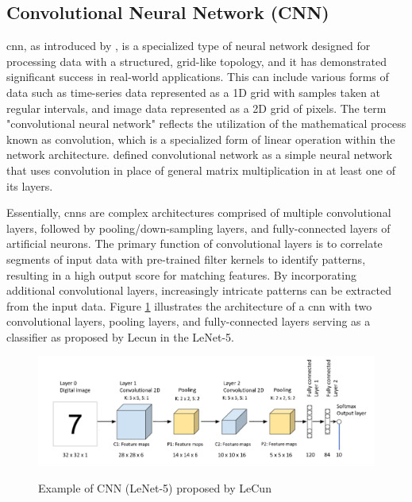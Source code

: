 \subsection{Convolutional Neural Network (CNN)}
\label{subsec:convolutional_neural_network_CNN}

\gls{cnn}, as introduced by \textcite{Lecun1998}, is a specialized type of neural network designed for processing data with a structured, grid-like topology, and it has demonstrated significant success in real-world applications. This can include various forms of data such as time-series data represented as a 1D grid with samples taken at regular intervals, and image data represented as a 2D grid of pixels. The term "convolutional neural network" reflects the utilization of the mathematical process known as convolution, which is a specialized form of linear operation within the network architecture. \textcite{Goodfellow2016} defined convolutional network as a simple neural network that uses convolution in place of general matrix multiplication in at least one of its layers.

Essentially, \gls{cnn}s are complex architectures comprised of multiple convolutional layers, followed by pooling/down-sampling layers, and fully-connected layers of artificial neurons. The primary function of convolutional layers is to correlate segments of input data with pre-trained filter kernels to identify patterns, resulting in a high output score for matching features. By incorporating additional convolutional layers, increasingly intricate patterns can be extracted from the input data. Figure \ref{fig:frmwk_cnn_LeNet-5} illustrates the architecture of a \gls{cnn} with two convolutional layers, pooling layers, and fully-connected layers serving as a classifier as proposed by Lecun in the LeNet-5.

\begin{figure}[htbp]
    \raggedright
        \caption{Example of CNN (LeNet-5) proposed by LeCun}
        \includegraphics[width=1\textwidth]{resources/images/030-theoretical_framework/Framework_cnn_LeNet-5.png}
        \label{fig:frmwk_cnn_LeNet-5}
\end{figure}

